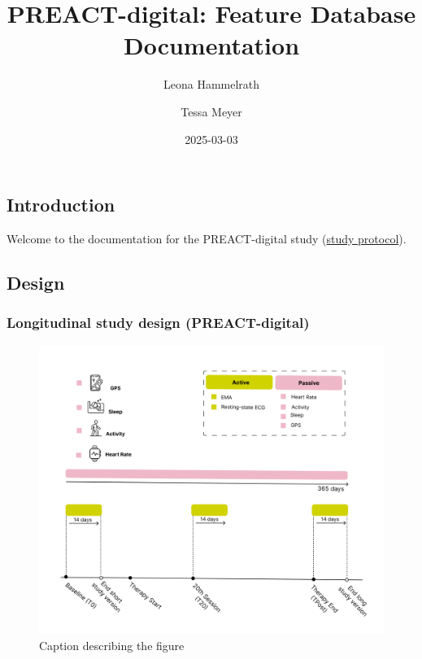 \documentclass[
  letterpaper,
  DIV=11,
  numbers=noendperiod]{scrartcl}
\title{PREACT-digital: Feature Database Documentation}
\author{Leona Hammelrath \and Tessa Meyer}
\date{2025-03-03}
\begin{document}
\maketitle


\subsection{Introduction}\label{introduction}

Welcome to the documentation for the PREACT-digital study
(\href{https://doi.org/10.1101/2025.03.14.25323957}{study protocol}).

\subsection{Design}\label{design}

\subsubsection{Longitudinal study design
(PREACT-digital)}\label{longitudinal-study-design-preact-digital}

\begin{figure}[H]

{\centering \includegraphics[width=6.25in,height=\textheight,keepaspectratio]{images/preact-digital_study-procedure_small.png}

}

\caption{Caption describing the figure}

\end{figure}%
\end{document}
